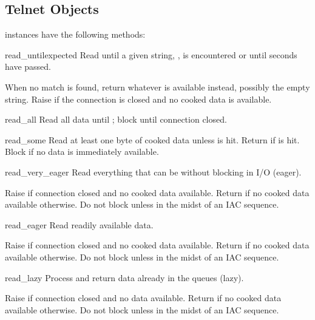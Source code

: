 \subsection{Telnet Objects \label{telnet-objects}}

 instances have the following methods:


\begin{methoddesc}[Telnet]{read_until}{expected}
Read until a given string, , is encountered or until
 seconds have passed.

When no match is found, return whatever is available instead,
possibly the empty string.  Raise  if the connection
is closed and no cooked data is available.
\end{methoddesc}

\begin{methoddesc}[Telnet]{read_all}{}
Read all data until \EOF; block until connection closed.
\end{methoddesc}

\begin{methoddesc}[Telnet]{read_some}{}
Read at least one byte of cooked data unless \EOF{} is hit.
Return  if \EOF{} is hit.  Block if no data is immediately
available.
\end{methoddesc}

\begin{methoddesc}[Telnet]{read_very_eager}{}
Read everything that can be without blocking in I/O (eager).

Raise  if connection closed and no cooked data
available.  Return  if no cooked data available otherwise.
Do not block unless in the midst of an IAC sequence.
\end{methoddesc}

\begin{methoddesc}[Telnet]{read_eager}{}
Read readily available data.

Raise  if connection closed and no cooked data
available.  Return  if no cooked data available otherwise.
Do not block unless in the midst of an IAC sequence.
\end{methoddesc}

\begin{methoddesc}[Telnet]{read_lazy}{}
Process and return data already in the queues (lazy).

Raise  if connection closed and no data available.
Return  if no cooked data available otherwise.  Do not block
unless in the midst of an IAC sequence.
\end{methoddesc}

